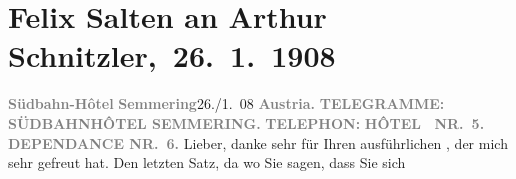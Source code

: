 

         
         \renewcommand{\erwaehntePersonen}{Personen: Samuel Fischer, Hedwig Fischer, Margarethe Kainz, Josef Kainz, Anna Katharina Rehmann, Felix Salten, Ottilie Salten, Paul Salten, Paula Schlenther, Paul Schlenther, Olga Schnitzler, Heinrich Schnitzler,  W. Fred}
         \renewcommand{\erwaehnteInstitutionen}{Institutionen: Franz-Grillparzer-Preis}
         \renewcommand{\erwaehnteOrte}{Orte: Semmering, Südbahnhotel, Wien, Österreich}
         \renewcommand{\erwaehnteWerke}{Werke: Der Weg ins Freie. Roman, Die neue Rundschau, Tagebuch}
               \section[ Felix Salten an Arthur Schnitzler, 26. 1. 1908]{ Felix Salten an Arthur Schnitzler, 26. 1. 1908}\nopagebreak{}\rehead{ }\begin{ledgroupsized}[t]{13cm}\normalsize\beginnumbering{} \toendnotes[C]{\smallbreak\pagebreak[2]} 
\toendnotes[C]{\smallbreak}\pstart
           \noindent{}{\pb}\textcolor{gray}{\textbf{Südbahn-Hôtel}}\pend
           \pstart
           \textcolor{gray}{\textbf{Semmering}}\hfill 26./1. 08\pend
           \pstart
           \textcolor{gray}{\textbf{Austria.}}\pend
           \pstart
           \textcolor{gray}{\textbf{\textbf{TELEGRAMME:}}}\pend
           \pstart
           \textcolor{gray}{\textbf{\textbf{SÜDBAHNHÔTEL SEMMERING.}}}\pend
           \pstart
           \textcolor{gray}{\textbf{TELEPHON:}}\pend
           \pstart
           \textcolor{gray}{\textbf{HÔTEL {\dotsfour} NR. 5.}}\pend
           \pstart
           \textcolor{gray}{\textbf{DEPENDANCE NR. 6.}}\pend
           \pstart{}Lieber,\pend\pstart
           danke sehr für Ihren ausführlichen \label{K_L03491-1v}\label{K_L03491-1h}, der mich sehr gefreut hat. Den letzten Satz, da wo Sie sagen, dass Sie sich

\end{ledgroupsized}
